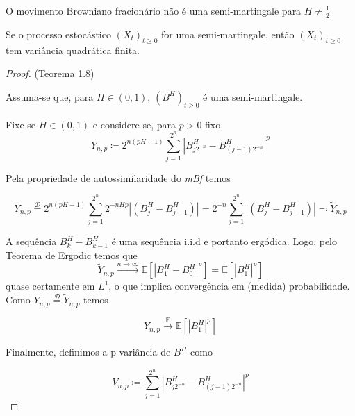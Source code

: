 \documentclass{article}
\begin{document}
\vspace{
0.5cm}

\begin{thm}
 O movimento Browniano fracionário não é uma semi-martingale para $H \neq \frac{1}{2}$
\end{thm}

\vspace{0.5cm}

\begin{lema}
    Se o processo estocástico $(X_t)_{t \geq 0}$ for uma semi-martingale, então $(X_t)_{t \geq 0}$ tem variância quadrática finita.
\end{lema}

\vspace{0.5cm}
    
\begin{proof}{(Teorema 1.8)}

Assuma-se que, para $H \in (0,1)$, $(B^H)_{t \geq 0}$ é uma semi-martingale.

Fixe-se $H\in (0,1)$ e considere-se, para $p>0$ fixo,
\begin{equation*}
    Y_{n,p} \coloneq 2^{n(pH-1)}\sum_{j=1}^{2^n}|B_{j2^{-n}}^H-B_{(j-1)2^{-n}}^H|^p
\end{equation*}

Pela propriedade de autossimilaridade do \textit{mBf} temos 

\begin{equation*}
    Y_{n,p} \overset{\mathcal{D}}{=} 2^{n(pH-1)}\sum_{j=1}^{2^n}2^{{-nHp}}|(B_{j}^H-B_{j-1}^H)|=2^{-n}\sum_{j=1}^{2^n}|(B_{j}^H-B_{j-1}^H)| \eqqcolon \tilde{Y}_{n,p}
\end{equation*}

A sequência $B^H_k-B^H_{k-1}$ é uma sequência i.i.d e portanto ergódica. Logo, pelo Teorema de Ergodic temos que 
\begin{equation*}
    \tilde{Y}_{n,p} \overset{n\rightarrow\infty}{\longrightarrow} \mathbb{E}[|B^H_{1}-B^H_0|^p]=\mathbb{E}[|B_1^H|^p]
\end{equation*}
quase certamente em $L^1$, o que implica convergência em (medida) probabilidade. Como $Y_{n,p} \overset{\mathcal{D}}{=}\tilde{Y}_{n,p}$ temos

\begin{equation*}
    Y_{n,p} \overset{\mathbb{P}}{\longrightarrow}\mathbb{E}[|B_1^H|^p]
\end{equation*}

Finalmente, definimos a p-variância de $B^H$ como 

\begin{equation*}
    V_{n,p}\coloneq\sum_{j=1}^{2^n} |B^H_{j2^{-n}}-B^H_{(j-1)2^{-n}}|^p
\end{equation*}


\end{proof}
\end{document}
